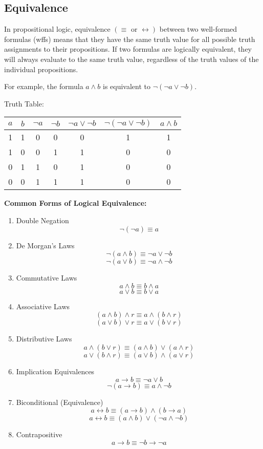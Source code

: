 \documentclass[12pt,a4paper,openany]{article}
\begin{document}
\subsection{Equivalence}\label{equivalence}

In propositional logic, equivalence
\((\equiv \text{ or } \leftrightarrow)\) between two well-formed
formulas (wffs) means that they have the same truth value for all
possible truth assignments to their propositions. If two formulas are
logically equivalent, they will always evaluate to the same truth value,
regardless of the truth values of the individual propositions.

For example, the formula \(a \land b\) is equivalent to
\(\neg(\neg a \lor \neg b)\).

Truth Table:

\begin{center}
\begin{tabular}{|c|c|c|c|c|c|c|}
\hline
\(a\) & \(b\) & \(\neg a\) & \(\neg b\) & \(\neg a \lor \neg b\) & \(\neg(\neg a \lor \neg b)\) & \(a \land b\) \\
\hline
1 & 1 & 0 & 0 & 0 & 1 & 1 \\
1 & 0 & 0 & 1 & 1 & 0 & 0 \\
0 & 1 & 1 & 0 & 1 & 0 & 0 \\
0 & 0 & 1 & 1 & 1 & 0 & 0 \\
\hline
\end{tabular}
\end{center}

\textbf{Common Forms of Logical Equivalence: }

\begin{enumerate}
\item
  Double Negation
  \[\neg(\neg a) \equiv a\]
\item
  De Morgan's Laws
  \[\neg(a \land b) \equiv \neg a \lor \neg b\]
  \[\neg(a \lor b) \equiv \neg a \land \neg b\]
\item
  Commutative Laws
  \[a \land b \equiv b \land a\]
  \[a \lor b \equiv b \lor a\]
\item
  Associative Laws
  \[(a \land b) \land r \equiv a \land (b \land r)\]
  \[(a \lor b) \lor r \equiv a \lor (b \lor r)\]
\item
  Distributive Laws
  \[a \land (b \lor r) \equiv (a \land b) \lor (a \land r)\]
  \[a \lor (b \land r) \equiv (a \lor b) \land (a \lor r)\]
\item
  Implication Equivalences
  \[a \to b \equiv \neg a \lor b\]
  \[\neg(a \to b) \equiv a \land \neg b\]
\item
  Biconditional (Equivalence)
  \[a \leftrightarrow b \equiv (a \to b) \land (b \to a)\]
  \[a \leftrightarrow b \equiv (a \land b) \lor (\neg a \land \neg b)\]
\item
  Contrapositive
  \[a \to b \equiv \neg b \to \neg a\]
\end{enumerate}
\end{document}

